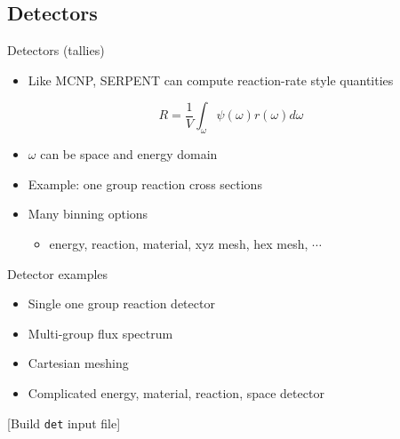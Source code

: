 \documentclass{beamer}
\newcommand{\examplefile}[1]{\centerline{[Build \texttt{#1} input file]}}
\begin{document}
\subsection{Detectors}
\begin{frame}{Detectors (tallies)}
    \begin{itemize}
        \item Like MCNP, SERPENT can compute reaction-rate style quantities
    \end{itemize}
    \begin{equation}
        R = \frac{1}{V}\int_\omega\psi(\omega)r(\omega)d\omega
    \end{equation}
    \begin{itemize}
        \item $\omega$ can be space and energy domain
        \item Example: one group reaction cross sections
        \item Many binning options
            \begin{itemize}
                \item energy, reaction, material, xyz mesh, hex mesh, $\cdots$
            \end{itemize}
    \end{itemize}
\end{frame}

\begin{frame}{Detector examples}
    \begin{itemize}
        \item Single one group reaction detector
        \item Multi-group flux spectrum
        \item Cartesian meshing
        \item Complicated energy, material, reaction, space detector
    \end{itemize}
    \examplefile{det}
\end{frame}
\end{document}
